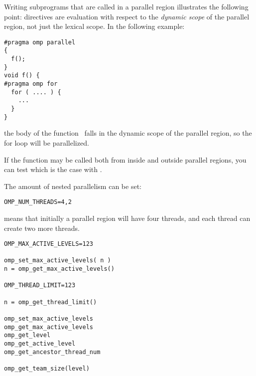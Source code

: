 Writing subprograms that are called in a parallel region illustrates
the following point: directives are evaluation with respect to the
\emph{dynamic scope} of the
parallel region, not just the lexical scope. In the following example:
\begin{verbatim}
#pragma omp parallel
{
  f();
}
void f() {
#pragma omp for
  for ( .... ) {
    ...
  }
}
\end{verbatim}
the body of the function~ falls in the dynamic scope of the
parallel region, so the for loop will be parallelized.

If the function may be called both from inside and outside parallel
regions, you can test which is the case with .

The amount of nested parallelism can be set:
\begin{verbatim}
OMP_NUM_THREADS=4,2
\end{verbatim}
means that initially a parallel region will have four threads, and
each thread can create two more threads.

\begin{verbatim}
OMP_MAX_ACTIVE_LEVELS=123

omp_set_max_active_levels( n )
n = omp_get_max_active_levels()

OMP_THREAD_LIMIT=123

n = omp_get_thread_limit()

omp_set_max_active_levels
omp_get_max_active_levels
omp_get_level
omp_get_active_level
omp_get_ancestor_thread_num

omp_get_team_size(level)
\end{verbatim}


